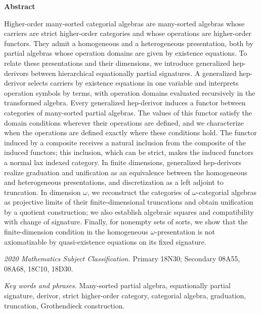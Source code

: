 \documentclass[a4paper, reqno]{amsbook}
\theoremstyle{plain}
\theoremstyle{definition}
\begin{document}
\thispagestyle{empty}
\begin{center}
\vspace*{2cm}
{\bfseries Abstract\par}
\end{center}
\vspace{0.5cm}
Higher-order many-sorted categorial algebras are many-sorted algebras whose carriers are strict higher-order categories and whose operations are higher-order functors.
They admit a homogeneous and a heterogeneous presentation, both by partial algebras whose operation domains are given by existence equations.
To relate these presentations and their dimensions, we introduce generalized hep-derivors between hierarchical equationally partial signatures.
A generalized hep-derivor selects carriers by existence equations in one variable and interprets operation symbols by terms, with operation domains evaluated recursively in the transformed algebra.
Every generalized hep-derivor induces a functor between categories of many-sorted partial algebras. The values of this functor satisfy the domain conditions wherever their operations are defined, and we characterize when the operations are defined exactly where these conditions hold.
The functor induced by a composite receives a natural inclusion from the composite of the induced functors; this inclusion, which can be strict, makes the induced functors a normal lax indexed category.
In finite dimensions, generalized hep-derivors realize graduation and unification as an equivalence between the homogeneous and heterogeneous presentations, and discretization as a left adjoint to truncation.
In dimension $\omega$, we reconstruct the categories of $\omega$-categorial algebras as projective limits of their finite-dimensional truncations and obtain unification by a quotient construction; we also establish algebraic squares and compatibility with change of signature.
Finally, for nonempty sets of sorts, we show that the finite-dimension condition in the homogeneous $\omega$-presentation is not axiomatizable by quasi-existence equations on its fixed signature.

\bigskip
\noindent\textit{2020 Mathematics Subject Classification.} Primary 18N30; Secondary 08A55, 08A68, 18C10, 18D30.

\smallskip
\noindent\textit{Key words and phrases.} Many-sorted partial algebra, equationally partial signature, derivor, strict higher-order category, categorial algebra, graduation, truncation, Grothendieck construction.
\cleardoublepage
\end{document}
